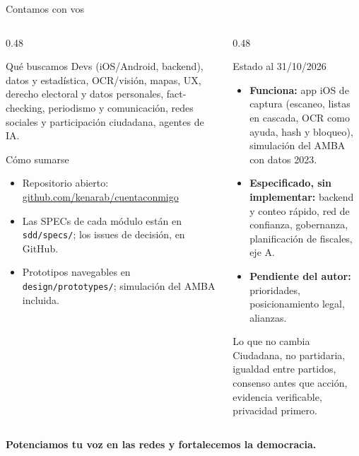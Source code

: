\documentclass[aspectratio=169,11pt]{beamer}
\begin{document}
\begin{frame}{Contamos con vos}
  \begin{columns}[T]
    \begin{column}{0.48\textwidth}
      \begin{exampleblock}{Qué buscamos}
        \footnotesize
        Devs (iOS/Android, backend), datos y estadística, OCR/visión, mapas, UX, derecho electoral y datos personales,
        fact-checking, periodismo y comunicación, redes sociales y participación ciudadana, agentes de IA.
      \end{exampleblock}
      \begin{block}{Cómo sumarse}
        \footnotesize
        \begin{itemize}
          \item Repositorio abierto: \href{https://github.com/kenarab/cuentaconmigo}{github.com/kenarab/cuentaconmigo}
          \item Las SPECs de cada módulo están en \texttt{sdd/specs/}; los issues de decisión, en GitHub.
          \item Prototipos navegables en \texttt{design/prototypes/}; simulación del AMBA incluida.
        \end{itemize}
      \end{block}
    \end{column}
    \begin{column}{0.48\textwidth}
      \begin{block}{Estado al 31/10/2026}
        \footnotesize
        \begin{itemize}
          \item \textbf{Funciona:} app iOS de captura (escaneo, listas en cascada, OCR como ayuda, hash y bloqueo), simulación del AMBA con datos 2023.
          \item \textbf{Especificado, sin implementar:} backend y conteo rápido, red de confianza, gobernanza, planificación de fiscales, eje A.
          \item \textbf{Pendiente del autor:} prioridades, posicionamiento legal, alianzas.
        \end{itemize}
      \end{block}
      \begin{alertblock}{Lo que no cambia}
        \footnotesize Ciudadana, no partidaria, igualdad entre partidos, consenso antes que acción, evidencia verificable, privacidad primero.
      \end{alertblock}
    \end{column}
  \end{columns}
  \vspace{4pt}
  \begin{center}
    {\large\bfseries\color{ccblue} Potenciamos tu voz en las redes y fortalecemos la democracia.}
  \end{center}
\end{frame}
\end{document}
